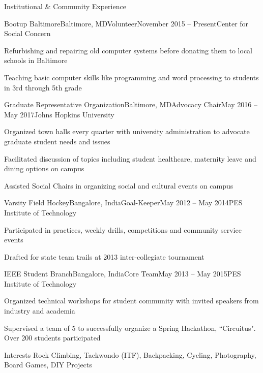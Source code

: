 \documentclass{resume}
\begin{document}
  \begin{rSection}{Institutional \& Community Experience}
\begin{rSubsection}{Bootup Baltimore}{Baltimore, MD}{Volunteer}{November 2015 -- Present}{Center for Social Concern}
\item Refurbishing and repairing old computer systems before donating them to local schools in Baltimore
\item Teaching basic computer skills like programming and word processing to students in 3rd through 5th grade 
    \end{rSubsection}
          \begin{rSubsection}{Graduate Representative Organization}{Baltimore, MD}{Advocacy Chair}{May 2016 -- May 2017}{Johns Hopkins University}
\item Organized town halls every quarter with university administration to advocate graduate student needs and issues
\item Facilitated discussion of topics including student healthcare, maternity leave and dining options on campus
\item Assisted Social Chairs in organizing social and cultural events on campus
    \end{rSubsection}
\begin{rSubsection}{Varsity Field Hockey}{Bangalore, India}{Goal-Keeper}{May 2012 -- May 2014}{PES Institute of Technology}
\item Participated in practices, weekly drills, competitions and community service events
\item Drafted for state team trails at 2013 inter-collegiate tournament 
    \end{rSubsection}

\begin{rSubsection}{IEEE Student Branch}{Bangalore, India}{Core Team}{May 2013 -- May 2015}{PES Institute of Technology}
\item Organized technical workshops for student community with invited speakers from industry and academia
\item Supervised a team of 5 to successfully organize a Spring Hackathon, ``Circuitus". Over 200 students participated
    \end{rSubsection}
  \end{rSection}   

\vspace{1em}

\begin{rSection}{Interests}
Rock Climbing, Taekwondo (ITF), Backpacking, Cycling, Photography, Board Games, DIY Projects
\end{rSection} 



\end{document}

